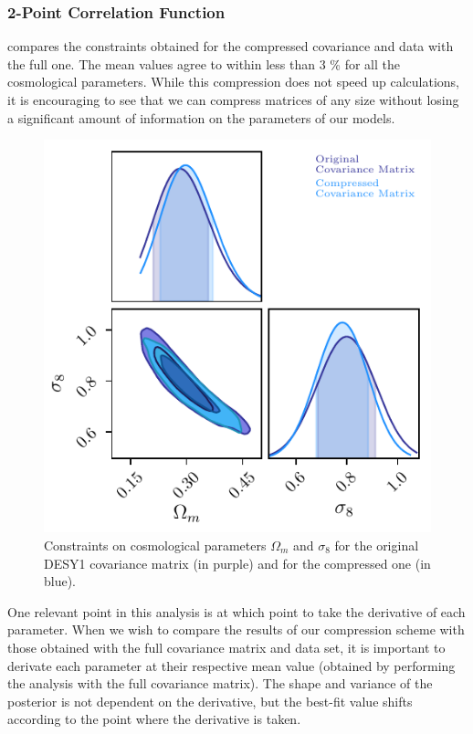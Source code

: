 \documentclass[twocolumn]{\docclass}
\begin{document}
	\subsubsection{2-Point Correlation Function}
	
	 compares the constraints obtained for the compressed covariance and data with the full one. The mean values agree to within less than 3 \% for all the cosmological parameters. While this compression does not speed up calculations, it is encouraging to see that we can compress matrices of any size without losing a significant amount of information on the parameters of our models. 
	
	\begin{figure}
		\includegraphics[width=0.9\columnwidth]{Compression/CompressionY1_wm-sigma8.pdf}
		\caption{Constraints on cosmological parameters $\Omega_m$ and $\sigma_8$ for the original DESY1 covariance matrix (in purple) and for the compressed one (in blue). \label{fig:compressiony1}}
	\end{figure}
	
	One relevant point in this analysis is at which point to take the derivative of each parameter. When we wish to compare the results of our compression scheme with those obtained with the full covariance matrix and data set, it is important to derivate each parameter at their respective mean value (obtained by performing the analysis with the full covariance matrix). The shape and variance of the posterior is not dependent on the derivative, but the best-fit value shifts according to the point where the derivative is taken.
	
\end{document}
